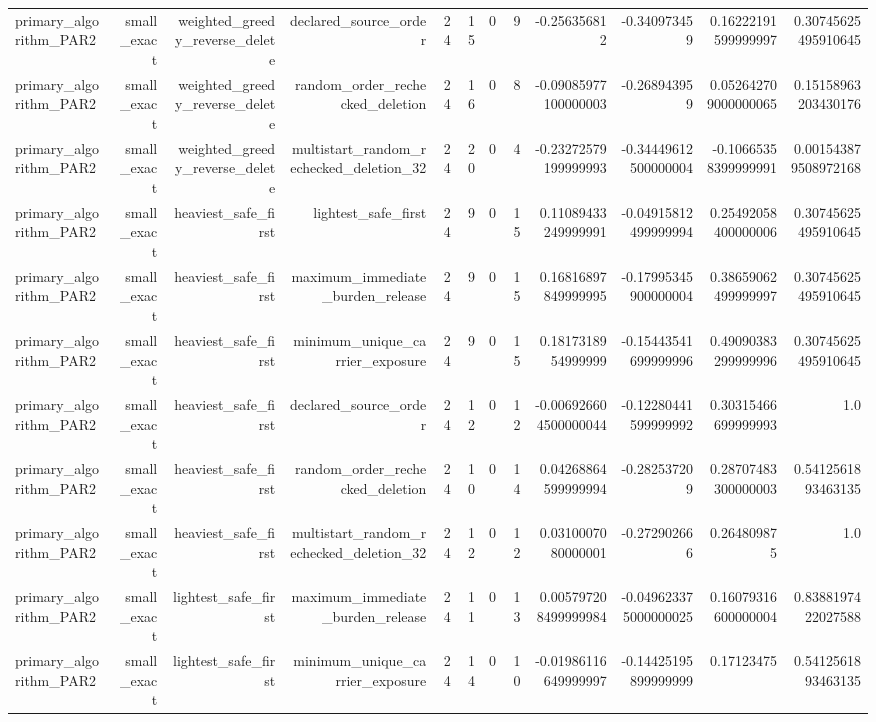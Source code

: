 {\begin{longtable}{lrrrrrrrrrrr}
primary\_algorithm\_PAR2 & small\_exact & weighted\_greedy\_reverse\_delete & declared\_source\_order & 24 & 15 & 0 & 9 & -0.256356812 & -0.340973459 & 0.16222191599999997 & 0.30745625495910645 \\
primary\_algorithm\_PAR2 & small\_exact & weighted\_greedy\_reverse\_delete & random\_order\_rechecked\_deletion & 24 & 16 & 0 & 8 & -0.09085977100000003 & -0.268943959 & 0.052642709000000065 & 0.15158963203430176 \\
primary\_algorithm\_PAR2 & small\_exact & weighted\_greedy\_reverse\_delete & multistart\_random\_rechecked\_deletion\_32 & 24 & 20 & 0 & 4 & -0.23272579199999993 & -0.34449612500000004 & -0.10665358399999991 & 0.001543879508972168 \\
primary\_algorithm\_PAR2 & small\_exact & heaviest\_safe\_first & lightest\_safe\_first & 24 & 9 & 0 & 15 & 0.11089433249999991 & -0.04915812499999994 & 0.25492058400000006 & 0.30745625495910645 \\
primary\_algorithm\_PAR2 & small\_exact & heaviest\_safe\_first & maximum\_immediate\_burden\_release & 24 & 9 & 0 & 15 & 0.16816897849999995 & -0.17995345900000004 & 0.38659062499999997 & 0.30745625495910645 \\
primary\_algorithm\_PAR2 & small\_exact & heaviest\_safe\_first & minimum\_unique\_carrier\_exposure & 24 & 9 & 0 & 15 & 0.1817318954999999 & -0.15443541699999996 & 0.49090383299999996 & 0.30745625495910645 \\
primary\_algorithm\_PAR2 & small\_exact & heaviest\_safe\_first & declared\_source\_order & 24 & 12 & 0 & 12 & -0.006926604500000044 & -0.12280441599999992 & 0.30315466699999993 & 1.0 \\
primary\_algorithm\_PAR2 & small\_exact & heaviest\_safe\_first & random\_order\_rechecked\_deletion & 24 & 10 & 0 & 14 & 0.04268864599999994 & -0.282537209 & 0.28707483300000003 & 0.5412561893463135 \\
primary\_algorithm\_PAR2 & small\_exact & heaviest\_safe\_first & multistart\_random\_rechecked\_deletion\_32 & 24 & 12 & 0 & 12 & 0.0310007080000001 & -0.272902666 & 0.264809875 & 1.0 \\
primary\_algorithm\_PAR2 & small\_exact & lightest\_safe\_first & maximum\_immediate\_burden\_release & 24 & 11 & 0 & 13 & 0.005797208499999984 & -0.049623375000000025 & 0.16079316600000004 & 0.8388197422027588 \\
primary\_algorithm\_PAR2 & small\_exact & lightest\_safe\_first & minimum\_unique\_carrier\_exposure & 24 & 14 & 0 & 10 & -0.01986116649999997 & -0.14425195899999999 & 0.17123475 & 0.5412561893463135 \\

\end{longtable}}
